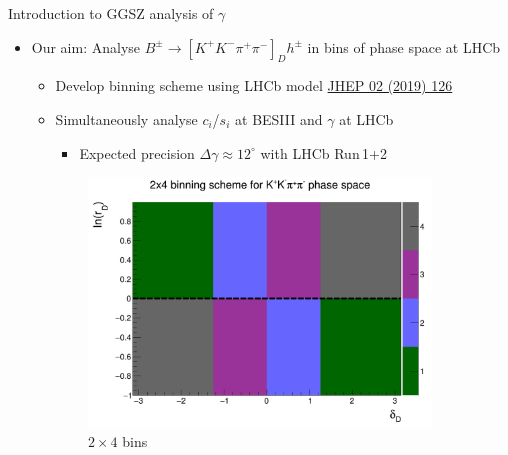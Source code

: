 \documentclass{beamer}
\begin{document}
\begin{frame}{Introduction to GGSZ analysis of $\gamma$}
  \begin{itemize}
    \setlength\itemsep{0.5em}
    \item{Our aim: Analyse $B^\pm\to[K^+K^-\pi^+\pi^-]_D h^\pm$ in bins of phase space at LHCb}
    \begin{itemize}
    \setlength\itemsep{0.2em}
      \item{Develop binning scheme using LHCb model \href{https://arxiv.org/abs/1811.08304}{JHEP 02 (2019) 126}}
      \item{Simultaneously analyse $c_i$/$s_i$ at BESIII and $\gamma$ at LHCb}
      \begin{itemize}
        \item{Expected precision $\Delta\gamma\approx 12^\circ$ with LHCb Run\,1+2}
      \end{itemize}
    \end{itemize}
  \end{itemize}
  \begin{figure}
    \centering
    \begin{subfigure}{0.5\textwidth}
      \centering
      \includegraphics[width=1.0\textwidth]{Plots/BinningSchemePlot_4Bins.png}
      \caption{$2\times 4$ bins}
    \end{subfigure}%
    \begin{subfigure}{0.5\textwidth}
      \centering

\end{subfigure}
\end{figure}
\end{frame}
\end{document}
